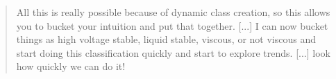  \begin{quote}
 All this is really possible because of dynamic class creation, so this allows you to bucket your intuition and put that together. [...] I can now bucket things as high voltage stable, liquid stable, viscous, or not viscous and start doing this classification quickly and start to explore trends. [...] look how quickly we can do it!%
 \end{quote}
